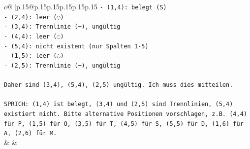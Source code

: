 \documentclass{article}
\begin{document}
{\begin{supertabular}{c@{$\;$}|p{.15\linewidth}@{}p{.15\linewidth}p{.15\linewidth}p{.15\linewidth}p{.15\linewidth}p{.15\linewidth}}
{{{\texttt{{-} (1,4): belegt (S)} \\
\texttt{{-} (2,4): leer (◌)} \\
\texttt{{-} (3,4): Trennlinie (─), ungültig} \\
\texttt{{-} (4,4): leer (◌)} \\
\texttt{{-} (5,4): nicht existent (nur Spalten 1{-}5)} \\
\texttt{{-} (1,5): leer (◌)} \\
\texttt{{-} (2,5): Trennlinie (─), ungültig} \\
\\ 
\texttt{Daher sind (3,4), (5,4), (2,5) ungültig. Ich muss dies mitteilen.} \\
\\ 
\texttt{SPRICH: (1,4) ist belegt, (3,4) und (2,5) sind Trennlinien, (5,4) existiert nicht. Bitte alternative Positionen vorschlagen, z.B. (4,4) für P, (1,5) für O, (3,5) für T, (4,5) für S, (5,5) für D, (1,6) für A, (2,6) für M.} \\
            }
        }
    }
    & & \\ \\


\end{supertabular}}
\end{document}
